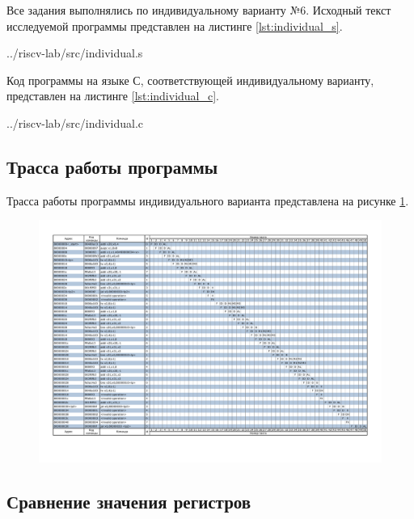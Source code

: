 Все задания выполнялись по индивидуальному варианту №6.
Исходный текст исследуемой программы представлен на листинге \ref{lst:individual_s}.
\begin{lstinputlisting}[
	label={lst:individual_s},
	caption={Исходный текст индивидуальной программы},
	]{../riscv-lab/src/individual.s}
\end{lstinputlisting}
\newpage

Код программы на языке С, соответствующей индивидуальному варианту, представлен на листинге \ref{lst:individual_c}.
\begin{lstinputlisting}[
	label={lst:individual_c},
	language=C,
	caption={Код программы на языке С},
	]{../riscv-lab/src/individual.c}
\end{lstinputlisting}
\newpage	

\subsection{Трасса работы программы}

Трасса работы программы индивидуального варианта представлена на рисунке \ref{fig:individualpipeline}.

\begin{figure}
	\centering
	\includegraphics[width=1\linewidth]{../images/individual_pipeline}
	\caption{}
	\label{fig:individualpipeline}
\end{figure}


\subsection{Сравнение значения регистров}


